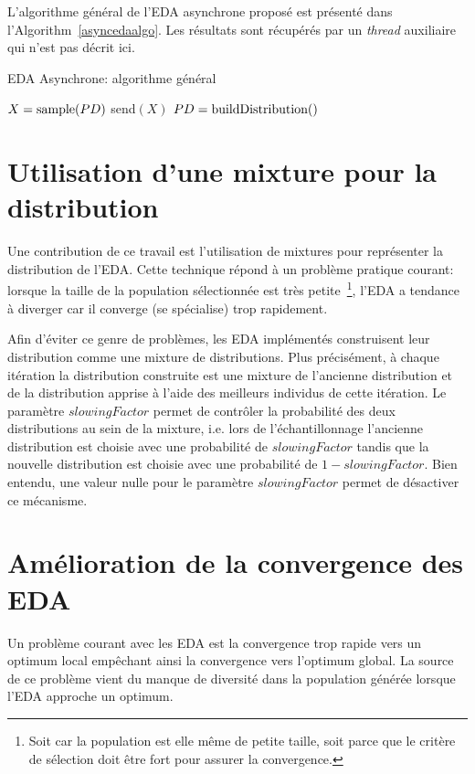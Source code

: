 \documentclass[a4paper, 11pt]{report}
\begin{document}
L'algorithme général de l'EDA asynchrone proposé est présenté dans l'Algorithm~\ref{asyncedaalgo}. Les résultats sont récupérés par un \textit{thread} auxiliaire qui n'est pas décrit ici. 


\begin{algorithm}                      
\caption{EDA Asynchrone: algorithme général}          
\label{asyncedaalgo}                           
\begin{algorithmic}   
\STATE $X = \textnormal{sample}(PD)$
\STATE send$(X)$
\ENDIF
{}
\STATE $PD = \textnormal{buildDistribution}()$
\ENDIF
\ENDWHILE
             
\end{algorithmic}
\end{algorithm}

\section{Utilisation d'une mixture pour la distribution}
\label{mixture}
Une contribution de ce travail est l'utilisation de mixtures pour représenter la distribution de l'EDA. Cette technique répond à un problème pratique courant: lorsque la taille de la population sélectionnée est très petite~\footnote{Soit car la population est elle même de petite taille, soit parce que le critère de sélection doit être fort pour assurer la convergence.}, l'EDA a tendance à diverger car il converge (se spécialise) trop rapidement. 

Afin d'éviter ce genre de problèmes, les EDA implémentés construisent leur distribution comme une mixture de distributions. Plus précisément, à chaque itération la distribution construite est une mixture de l'ancienne distribution et de la distribution apprise à l'aide des meilleurs individus de cette itération. Le paramètre $slowingFactor$ permet de contrôler la probabilité des deux distributions au sein de la mixture, i.e. lors de l'échantillonnage l'ancienne distribution est choisie avec une probabilité de $slowingFactor$ tandis que la nouvelle distribution est choisie avec une probabilité de $1-slowingFactor$. Bien entendu, une valeur nulle pour le paramètre $slowingFactor$ permet de désactiver ce mécanisme.

\section{Amélioration de la convergence des EDA}
\label{edaimprove}
Un problème courant avec les EDA est la convergence trop rapide vers un optimum local empêchant ainsi la convergence vers l'optimum global. La source de ce problème vient du manque de diversité dans la population générée lorsque l'EDA approche un optimum. 
\end{document}
